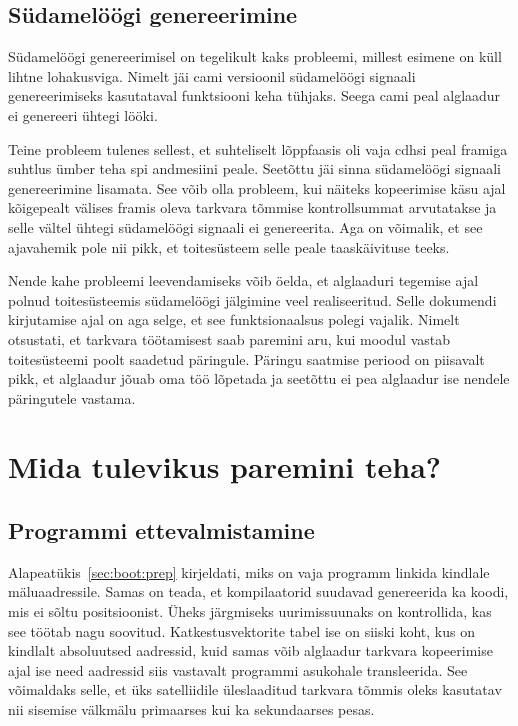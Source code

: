 \documentclass[12pt,a4paper]{article}
\begin{document}
\subsection{Südamelöögi genereerimine}
Südamelöögi genereerimisel on tegelikult kaks probleemi, millest esimene on küll
lihtne lohakusviga. Nimelt jäi \gls{cam}i versioonil südamelöögi signaali
genereerimiseks kasutataval funktsiooni keha tühjaks. Seega \gls{cam}i peal
alglaadur ei genereeri ühtegi lööki.

Teine probleem tulenes sellest, et suhteliselt lõppfaasis oli vaja \gls{cdhs}i
peal \gls{fram}iga suhtlus ümber teha \gls{spi} andmesiini peale. Seetõttu jäi
sinna südamelöögi signaali genereerimine lisamata. See võib olla probleem, kui
näiteks kopeerimise käsu ajal kõigepealt välises \gls{fram}is oleva tarkvara
tõmmise kontrollsummat arvutatakse ja selle vältel ühtegi südamelöögi signaali
ei genereerita. Aga on võimalik, et see ajavahemik pole nii pikk, et
toitesüsteem selle peale taaskäivituse teeks.

Nende kahe probleemi leevendamiseks võib öelda, et alglaaduri tegemise ajal
polnud toitesüsteemis südamelöögi jälgimine veel realiseeritud. Selle dokumendi
kirjutamise ajal on aga selge, et see funktsionaalsus polegi vajalik. Nimelt
otsustati, et tarkvara töötamisest saab paremini aru, kui moodul vastab
toitesüsteemi poolt saadetud päringule. Päringu saatmise periood on piisavalt
pikk, et alglaadur jõuab oma töö lõpetada ja seetõttu ei pea alglaadur ise
nendele päringutele vastama.

\label{sec:prob:beat}
\section{Mida tulevikus paremini teha?}
\subsection{Programmi ettevalmistamine}
Alapeatükis~\ref{sec:boot:prep} kirjeldati, miks on vaja programm linkida kindlale
mäluaadressile. Samas on teada, et kompilaatorid suudavad genereerida ka koodi,
mis ei sõltu positsioonist. Üheks järgmiseks uurimissuunaks on kontrollida, kas
see töötab nagu soovitud. Katkestusvektorite tabel ise on siiski koht, kus on
kindlalt absoluutsed aadressid, kuid samas võib alglaadur tarkvara kopeerimise
ajal ise need aadressid siis vastavalt programmi asukohale transleerida. See
võimaldaks selle, et üks satelliidile üleslaaditud tarkvara tõmmis oleks kasutatav
nii sisemise välkmälu primaarses kui ka sekundaarses pesas.
\end{document}

